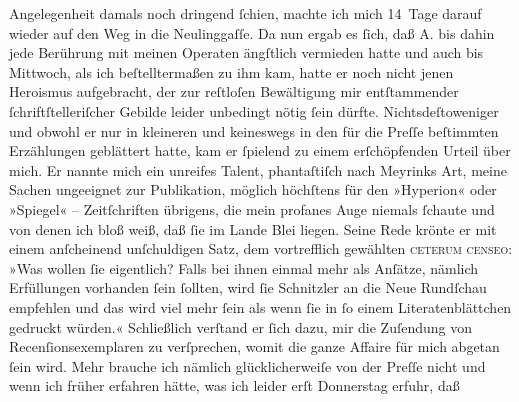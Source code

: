 \begin{ledgroupsized}[t]{13cm}
               Angelegenheit {\pb}damals noch dringend
               ſchien, machte ich mich 14 Tage darauf wieder auf den Weg in die Neulinggaſſe. Da nun ergab es ſich, daß A. bis dahin jede Berührung mit meinen Operaten ängſtlich
               vermieden hatte und auch bis Mittwoch, als ich beſtelltermaßen zu ihm
               kam, hatte er noch nicht jenen Heroismus aufgebracht, der zur reſtloſen Bewältigung
               mir entſtammender ſchriftſtelleriſcher Gebilde leider unbedingt nötig ſein dürfte.
               Nichtsdeſtoweniger und obwohl er nur in kleineren und keineswegs in den für die Preſſe beſtimmten Erzählungen geblättert hatte,
               kam er ſpielend zu einem erſchöpfenden Urteil über mich. Er nannte mich ein unreifes
               Talent, phantaſtiſch nach Meyrinks Art, meine
               Sachen ungeeignet zur Publikation, möglich höchſtens für den »Hyperion« oder »Spiegel« –
               Zeitſchriften {\pb}übrigens, die mein profanes
               Auge niemals ſchaute und von denen ich bloß weiß, daß ſie im Lande Blei liegen. Seine Rede krönte er mit einem
               anſcheinend unſchuldigen Satz, dem vortrefflich gewählten \textsc{ceterum censeo}: »Was wollen ſie eigentlich? Falls bei ihnen einmal mehr als
               Anſätze, nämlich Erfüllungen vorhanden ſein ſollten, wird ſie Schnitzler an die Neue Rundſchau empfehlen und das wird viel mehr
               ſein als wenn ſie in ſo einem Literatenblättchen gedruckt würden.« Schließlich
               verſtand er ſich dazu, mir die Zuſendung von Recenſionsexemplaren zu verſprechen,
               womit die ganze Affaire für mich abgetan ſein wird. Mehr brauche ich nämlich
               glücklicherweiſe von der Preſſe nicht und wenn
               ich früher erfahren hätte, was ich leider erſt Donnerstag erfuhr, daß

\end{ledgroupsized}
